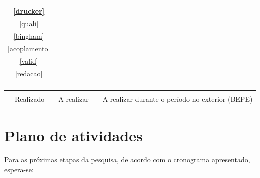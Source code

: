\begin{table}[H]
{\begin{tabular}{c|cccc|cccc|cccc|cc|cccc}
			\ref{drucker}  &  &  &   &   &   &  &  &  &  \cellcolor{realizado} &  \cellcolor{realizado} &  \cellcolor{pendente}  &  \cellcolor{pendente}  &  &  &  &  \\ \hline
			\ref{quali}                         &                                         &                       &                       &                       & \cellcolor{realizado} & \cellcolor{realizado} & \cellcolor{realizado} & \cellcolor{realizado} &  \cellcolor{realizado}  &  \cellcolor{realizado}  &  \cellcolor{realizado}  &                      &                      &                      &                      &                      &   &  \\ \hline
			\ref{bingham}  &    &   &  &   &  &    &    &   &  &  &   &   &  \cellcolor{realizar}  &   \cellcolor{realizar}  &  &  &   &  \\ \hline
			\ref{acoplamento}  &    &   &  &   &  &    &    &   &  &  &   &   &  \cellcolor{realizar}  &   \cellcolor{realizar}  &  &  &   &  \\ \hline
			\ref{valid}  &    &   &  &   &  &    &    &   &  &  &   &   &  \cellcolor{realizar}  &   \cellcolor{realizar}  & \cellcolor{pendente} & \cellcolor{pendente} &   &  \\ \hline
			\ref{redacao} & &   &  &   &  &   &  & &  &   &  &  &  &  & \cellcolor{pendente} & \cellcolor{pendente} & \cellcolor{pendente} & \cellcolor{pendente}\\ \Xhline{3\arrayrulewidth}
		\end{tabular}
		\begin{tabular}{llllll}
			                      &           &                      &            &                      &                                                   \\
			\cellcolor{realizado} & Realizado & \cellcolor{pendente} & A realizar & \cellcolor{realizar} & A realizar durante o período no exterior (BEPE) \\
		\end{tabular}
	}
	\label{tab:cronograma}
\end{table}

\section{Plano de atividades}

Para as próximas etapas da pesquisa, de acordo com o cronograma apresentado, espera-se:

